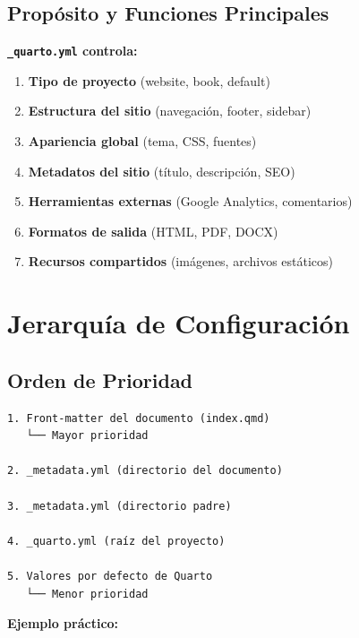 \documentclass[
  doc,
  floatsintext,
  longtable,
  a4paper,
  nolmodern,
  notxfonts,
  notimes,
  12pt,
  colorlinks=true,linkcolor=blue,citecolor=blue,urlcolor=blue]{apa7}
\providecommand{\tightlist}{%
  \setlength{\itemsep}{0pt}\setlength{\parskip}{0pt}}
\begin{document}
\subsection{Propósito y Funciones
Principales}\label{propuxf3sito-y-funciones-principales}

\textbf{\texttt{\_quarto.yml} controla:}

\begin{enumerate}
\def\labelenumi{\arabic{enumi}.}
\tightlist
\item
  \textbf{Tipo de proyecto} (website, book, default)
\item
  \textbf{Estructura del sitio} (navegación, footer, sidebar)
\item
  \textbf{Apariencia global} (tema, CSS, fuentes)
\item
  \textbf{Metadatos del sitio} (título, descripción, SEO)
\item
  \textbf{Herramientas externas} (Google Analytics, comentarios)
\item
  \textbf{Formatos de salida} (HTML, PDF, DOCX)
\item
  \textbf{Recursos compartidos} (imágenes, archivos estáticos)
\end{enumerate}

\section{Jerarquía de
Configuración}\label{jerarquuxeda-de-configuraciuxf3n}

\subsection{Orden de Prioridad}\label{orden-de-prioridad}

\begin{verbatim}
1. Front-matter del documento (index.qmd)
   └── Mayor prioridad
   
2. _metadata.yml (directorio del documento)
   
3. _metadata.yml (directorio padre)
   
4. _quarto.yml (raíz del proyecto)
   
5. Valores por defecto de Quarto
   └── Menor prioridad
\end{verbatim}

\textbf{Ejemplo práctico:}
\end{document}
